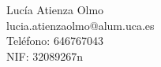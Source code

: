 Lucía Atienza Olmo \\ %
lucia.atienzaolmo@alum.uca.es \\ %
Teléfono: 646767043 \\ %
NIF: 32089267n  \\ %
